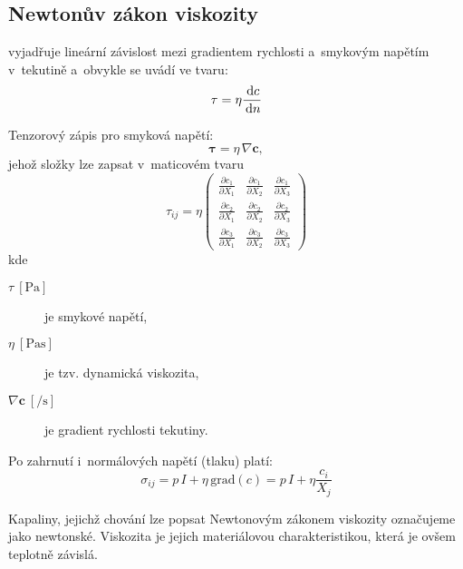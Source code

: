 
\subsection{Newtonův zákon viskozity}
vyjadřuje lineární závislost mezi gradientem rychlosti a~smykovým napětím v~tekutině a~obvykle se uvádí ve tvaru:
\begin{equation}
\tau = \eta \frac{\,\mathrm{d} c}{\,\mathrm{d} n}
\end{equation}

Tenzorový zápis pro smyková napětí:
\begin{equation}
	\bm{\tau} = \eta\, \nabla \bm{c},
\end{equation}
jehož složky lze zapsat v~maticovém tvaru
\begin{equation}
	\tau_{ij} = \eta \left(\begin{matrix}
		\frac{\partial c_1}{\partial X_1} & \frac{\partial c_1}{\partial X_2} & \frac{\partial c_1}{\partial X_3}\\
		\frac{\partial c_2}{\partial X_1} & \frac{\partial c_2}{\partial X_2} & \frac{\partial c_2}{\partial X_3}\\
		\frac{\partial c_3}{\partial X_1} & \frac{\partial c_3}{\partial X_2} & \frac{\partial c_3}{\partial X_3}
	\end{matrix}\right)
\end{equation}
kde
\begin{description}
	\item[{$\tau\:[\si{\pascal}]$}] je smykové napětí,
	\item[{$\eta\:[\si{\pascal\second}]$}] je tzv. dynamická viskozita,
	\item[{$\nabla \bm{c}\:[\si{\per\second}]$}] je gradient rychlosti tekutiny.
\end{description}

Po zahrnutí i~normálových napětí (tlaku) platí:
\begin{equation}
\sigma_{ij} = p\, I + \eta\, \mathrm{grad}(c) = p\, I + \eta \frac{c_i}{X_j}
\end{equation}

Kapaliny, jejichž chování lze popsat Newtonovým zákonem viskozity označujeme jako newtonské. Viskozita je jejich materiálovou charakteristikou, která je ovšem teplotně závislá.
